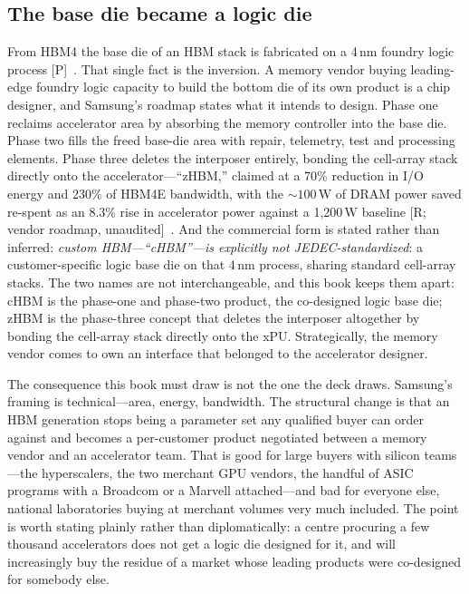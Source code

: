 \subsection{The base die became a logic die}

From HBM4 the base die of an HBM stack is fabricated on a 4\,nm foundry logic process [P]~\cite{hc2026-chbm}. That single fact is the inversion. A memory vendor buying leading-edge foundry logic capacity to build the bottom die of its own product is a chip designer, and Samsung's roadmap states what it intends to design. Phase one reclaims accelerator area by absorbing the memory controller into the base die. Phase two fills the freed base-die area with repair, telemetry, test and processing elements. Phase three deletes the interposer entirely, bonding the cell-array stack directly onto the accelerator---``zHBM,'' claimed at a 70\% reduction in I/O energy and 230\% of HBM4E bandwidth, with the ${\sim}100$\,W of DRAM power saved re-spent as an 8.3\% rise in accelerator power against a 1,200\,W baseline [R; vendor roadmap, unaudited]~\cite{hc2026-chbm}. And the commercial form is stated rather than inferred: \emph{custom HBM---``cHBM''---is explicitly not JEDEC-standardized}: a customer-specific logic base die on that 4\,nm process, sharing standard cell-array stacks. The two names are not interchangeable, and this book keeps them apart: cHBM is the phase-one and phase-two product, the co-designed logic base die; zHBM is the phase-three concept that deletes the interposer altogether by bonding the cell-array stack directly onto the xPU. Strategically, the memory vendor comes to own an interface that belonged to the accelerator designer.

The consequence this book must draw is not the one the deck draws. Samsung's framing is technical---area, energy, bandwidth. The structural change is that an HBM generation stops being a parameter set any qualified buyer can order against and becomes a per-customer product negotiated between a memory vendor and an accelerator team. That is good for large buyers with silicon teams---the hyperscalers, the two merchant GPU vendors, the handful of ASIC programs with a Broadcom or a Marvell attached---and bad for everyone else, national laboratories buying at merchant volumes very much included. The point is worth stating plainly rather than diplomatically: a centre procuring a few thousand accelerators does not get a logic die designed for it, and will increasingly buy the residue of a market whose leading products were co-designed for somebody else.

